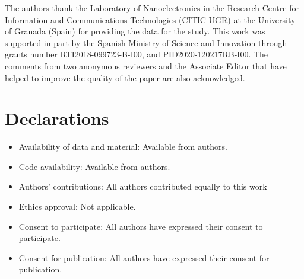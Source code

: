 \documentclass[sn-mathphys]{sn-jnl}%
\theoremstyle{thmstyleone}%
\theoremstyle{thmstyletwo}%
\theoremstyle{thmstylethree}%
\begin{document}
The authors thank the Laboratory of Nanoelectronics in the Research Centre for Information and Communications Technologies (CITIC-UGR) at the University of Granada (Spain) for providing the data for the study. This work was supported in part by the Spanish Ministry of Science and Innovation through grants number	RTI2018-099723-B-I00, and PID2020-120217RB-I00.
The comments from two anonymous reviewers and the Associate Editor that have helped to improve the quality of the paper are also acknowledged.

\section*{Declarations}
%

\begin{itemize}
\item Availability of data and material: Available from authors.
\item Code availability: Available from authors.
\item Authors' contributions: All authors contributed equally to this work
\item Ethics approval: Not applicable.
\item Consent to participate: All authors have expressed their consent to participate.
\item Consent for publication: All authors have expressed their consent for publication.
%
\end{itemize}






\end{document}
